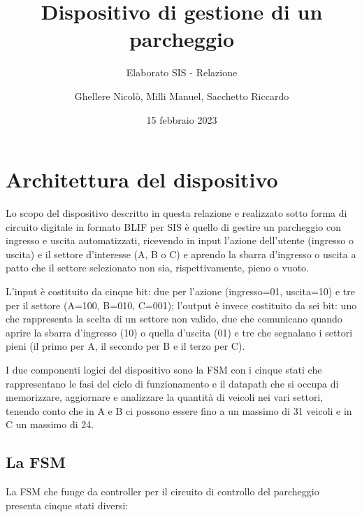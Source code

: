 \documentclass[
  12pt,
  a4paper,
  headings=optiontoheadandtoc
]{scrreprt}
\author{Ghellere Nicolò, Milli Manuel, Sacchetto Riccardo}
\date{15 febbraio 2023}
\title{Dispositivo di gestione di un parcheggio}
\subtitle{Elaborato SIS - Relazione}
\begin{document}
\maketitle

\renewcommand*\contentsname{Indice}
\tableofcontents
\newpage

\chapter[nonumber=true]{Architettura del dispositivo}

Lo scopo del dispositivo descritto in questa relazione e realizzato sotto forma di circuito digitale in formato BLIF per SIS è quello di gestire un parcheggio con ingresso e uscita automatizzati, ricevendo in input l'azione dell'utente (ingresso o uscita) e il settore d'interesse (A, B o C) e aprendo la sbarra d'ingresso o uscita a patto che il settore selezionato non sia, rispettivamente, pieno o vuoto.

L'input è costituito da cinque bit: due per l'azione (ingresso=01, uscita=10) e tre per il settore (A=100, B=010, C=001); l'output è invece costituito da sei bit: uno che rappresenta la scelta di un settore non valido, due che comunicano quando aprire la sbarra d'ingresso (10) o quella d'uscita (01) e tre che segnalano i settori pieni (il primo per A, il secondo per B e il terzo per C).

I due componenti logici del dispositivo sono la FSM con i cinque stati che rappresentano le fasi del ciclo di funzionamento e il datapath che si occupa di memorizzare, aggiornare e analizzare la quantità di veicoli nei vari settori, tenendo conto che in A e B ci possono essere fino a un massimo di 31 veicoli e in C un massimo di 24.

\section[nonumber=true]{La FSM}

La FSM che funge da controller per il circuito di controllo del parcheggio presenta cinque stati diversi:
\end{document}
